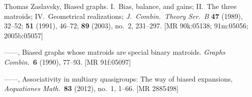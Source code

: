 \documentclass[reqno,12pt]{amsart}
\theoremstyle{remark}
\numberwithin{equation}{section}
\numberwithin{figure}{section}
\begin{document}
\begin{thebibliography}{99}
 Thomas Zaslavsky, 
Biased graphs.  
I.\ Bias, balance, and gains; 
II.\ The three matroids;
IV.\ Geometrical realizations;  
\emph{J.\ Combin.\ Theory Ser.\ B} 
{\bf 47} (1989), 32--52; {\bf 51} (1991), 46--72; {\bf 89} (2003), no.\ 2, 231--297.  
[MR 90k:05138; 91m:05056; 2005b:05057]  %

 ------,
Biased graphs whose matroids are special binary matroids.
\emph{Graphs Combin.}\ {\bf 6} (1990), 77--93.  
[MR 91f:05097]  %

 ------, 
Associativity in multiary quasigroups:  The way of biased expansions, 
\emph{Aequationes Math.}\ {\bf 83} (2012), no.\ 1, 1--66.
[MR 2885498]  %

\end{thebibliography}
\end{document}
